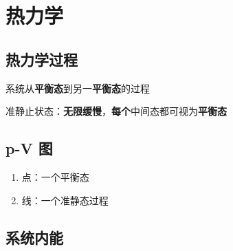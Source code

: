 \chapter{热力学}

\section{热力学过程}

系统从\textbf{平衡态}到另一\textbf{平衡态}的过程

准静止状态：\textbf{无限缓慢}，\textbf{每个}中间态都可视为\textbf{平衡态}

\section{p-V 图}

\begin{enumerate}
    \item 点：一个平衡态
    \item 线：一个准静态过程
\end{enumerate}

\section{系统内能}

